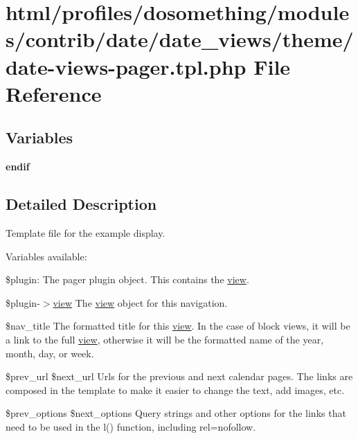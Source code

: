 \hypertarget{date-views-pager_8tpl_8php}{
\section{html/profiles/dosomething/modules/contrib/date/date\_\-views/theme/date-\/views-\/pager.tpl.php File Reference}
\label{date-views-pager_8tpl_8php}
}
\subsection*{Variables}
\begin{DoxyCompactItemize}
\item 
\hypertarget{date-views-pager_8tpl_8php_a82cd33ca97ff99f2fcc5e9c81d65251b}{
{\bfseries endif}}
\label{date-views-pager_8tpl_8php_a82cd33ca97ff99f2fcc5e9c81d65251b}

\end{DoxyCompactItemize}


\subsection{Detailed Description}
Template file for the example display.

Variables available:

\$plugin: The pager plugin object. This contains the \hyperlink{classview}{view}.

\$plugin-\/$>$\hyperlink{classview}{view} The \hyperlink{classview}{view} object for this navigation.

\$nav\_\-title The formatted title for this \hyperlink{classview}{view}. In the case of block views, it will be a link to the full \hyperlink{classview}{view}, otherwise it will be the formatted name of the year, month, day, or week.

\$prev\_\-url \$next\_\-url Urls for the previous and next calendar pages. The links are composed in the template to make it easier to change the text, add images, etc.

\$prev\_\-options \$next\_\-options Query strings and other options for the links that need to be used in the l() function, including rel=nofollow. 